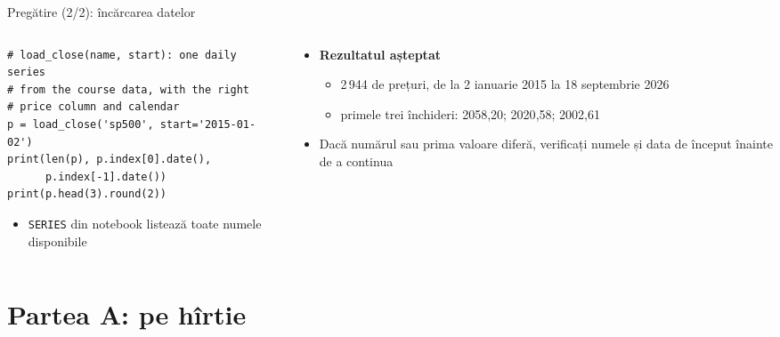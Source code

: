 \begin{frame}[fragile]{Pregătire (2/2): încărcarea datelor}
\itemsize{\small}
\begin{columns}[T]
\begin{column}{0.55\textwidth}
\begin{lstlisting}
# load_close(name, start): one daily series
# from the course data, with the right
# price column and calendar
p = load_close('sp500', start='2015-01-02')
print(len(p), p.index[0].date(),
      p.index[-1].date())
print(p.head(3).round(2))
\end{lstlisting}
\begin{itemize}
    \item \texttt{SERIES} din notebook listează toate numele disponibile
\end{itemize}
\end{column}
\begin{column}{0.42\textwidth}
\begin{itemize}
    \item \textbf{Rezultatul așteptat}
    \begin{itemize}
        \item 2\,944 de prețuri, de la 2 ianuarie 2015 la 18 septembrie 2026
        \item primele trei închideri: 2058{,}20; 2020{,}58; 2002{,}61
    \end{itemize}
    \item Dacă numărul sau prima valoare diferă, verificați numele și data de început înainte de a continua
\end{itemize}
\end{column}
\end{columns}
\end{frame}


\section{Partea A: pe hîrtie}

